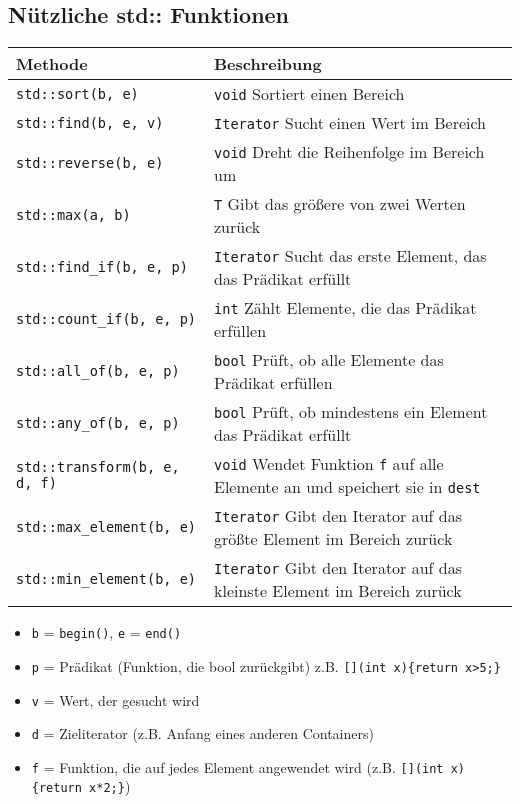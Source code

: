 \documentclass[10pt, a3paper, landscape]{article}
\begin{document}
\begin{multicols*}{4}
\section{Nützliche std:: Funktionen}
\newline 
\noindent
\begin{tabularx}{\linewidth}{l >{\RaggedRight}X}
\toprule
\textbf{Methode} & \textbf{Beschreibung} \\
\midrule
\lstinline|std::sort(b, e)| & \lstinline|void|  Sortiert einen Bereich \\
\lstinline|std::find(b, e, v)| & \lstinline|Iterator|  Sucht einen Wert im Bereich \\
\lstinline|std::reverse(b, e)| & \lstinline|void|  Dreht die Reihenfolge im Bereich um \\
\lstinline|std::max(a, b)| & \lstinline|T|  Gibt das größere von zwei Werten zurück \\
\lstinline|std::find_if(b, e, p)| & \lstinline|Iterator|  Sucht das erste Element, das das Prädikat erfüllt \\
\lstinline|std::count_if(b, e, p)| & \lstinline|int|  Zählt Elemente, die das Prädikat erfüllen \\
\lstinline|std::all_of(b, e, p)| & \lstinline|bool|  Prüft, ob alle Elemente das Prädikat erfüllen \\
\lstinline|std::any_of(b, e, p)| & \lstinline|bool|  Prüft, ob mindestens ein Element das Prädikat erfüllt \\
\lstinline|std::transform(b, e, d, f)| & \lstinline|void|  Wendet Funktion \lstinline|f| auf alle Elemente an und speichert sie in \lstinline|dest| \\
\lstinline|std::max_element(b, e)| & \lstinline|Iterator|  Gibt den Iterator auf das größte Element im Bereich zurück \\
\lstinline|std::min_element(b, e)| & \lstinline|Iterator|  Gibt den Iterator auf das kleinste Element im Bereich zurück \\

\bottomrule
\end{tabularx}

\begin{itemize}
    \item \lstinline|b| = \lstinline|begin()|, \lstinline|e| = \lstinline|end()|
    \item \lstinline|p| = Prädikat (Funktion, die bool zurückgibt) z.B. \lstinline|[](int x){return x>5;}|
    \item \lstinline|v| = Wert, der gesucht wird
    \item \lstinline|d| = Zieliterator (z.B. Anfang eines anderen Containers)
    \item \lstinline|f| = Funktion, die auf jedes Element angewendet wird (z.B. \lstinline|[](int x){return x*2;}|)
\end{itemize}




\end{multicols*}
\end{document}
